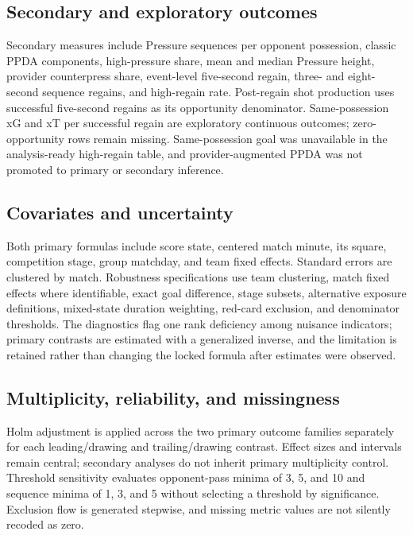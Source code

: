 \subsection{Secondary and exploratory outcomes}
Secondary measures include Pressure sequences per opponent possession, classic PPDA components, high-pressure share, mean and median Pressure height, provider counterpress share, event-level five-second regain, three- and eight-second sequence regains, and high-regain rate. Post-regain shot production uses successful five-second regains as its opportunity denominator. Same-possession xG and xT per successful regain are exploratory continuous outcomes; zero-opportunity rows remain missing. Same-possession goal was unavailable in the analysis-ready high-regain table, and provider-augmented PPDA was not promoted to primary or secondary inference.

\subsection{Covariates and uncertainty}
Both primary formulas include score state, centered match minute, its square, competition stage, group matchday, and team fixed effects. Standard errors are clustered by match. Robustness specifications use team clustering, match fixed effects where identifiable, exact goal difference, stage subsets, alternative exposure definitions, mixed-state duration weighting, red-card exclusion, and denominator thresholds. The diagnostics flag one rank deficiency among nuisance indicators; primary contrasts are estimated with a generalized inverse, and the limitation is retained rather than changing the locked formula after estimates were observed.

\subsection{Multiplicity, reliability, and missingness}
Holm adjustment is applied across the two primary outcome families separately for each leading/drawing and trailing/drawing contrast. Effect sizes and intervals remain central; secondary analyses do not inherit primary multiplicity control. Threshold sensitivity evaluates opponent-pass minima of 3, 5, and 10 and sequence minima of 1, 3, and 5 without selecting a threshold by significance. Exclusion flow is generated stepwise, and missing metric values are not silently recoded as zero.
